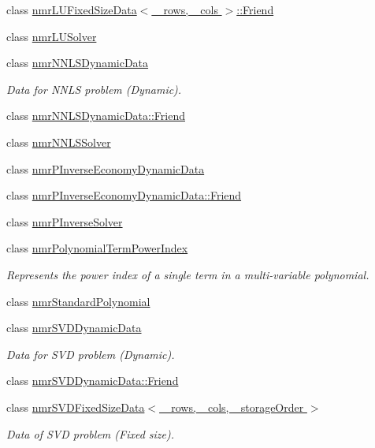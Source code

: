 \begin{DoxyCompactItemize}
class \hyperlink{classnmr_l_u_fixed_size_data_1_1_friend}{nmr\+L\+U\+Fixed\+Size\+Data$<$ \+\_\+rows, \+\_\+cols $>$\+::\+Friend}
\item 
class \hyperlink{classnmr_l_u_solver}{nmr\+L\+U\+Solver}
\item 
class \hyperlink{classnmr_n_n_l_s_dynamic_data}{nmr\+N\+N\+L\+S\+Dynamic\+Data}
\begin{DoxyCompactList}\small\item\em Data for N\+N\+L\+S problem (Dynamic). \end{DoxyCompactList}\item 
class \hyperlink{classnmr_n_n_l_s_dynamic_data_1_1_friend}{nmr\+N\+N\+L\+S\+Dynamic\+Data\+::\+Friend}
\item 
class \hyperlink{classnmr_n_n_l_s_solver}{nmr\+N\+N\+L\+S\+Solver}
\item 
class \hyperlink{classnmr_p_inverse_economy_dynamic_data}{nmr\+P\+Inverse\+Economy\+Dynamic\+Data}
\item 
class \hyperlink{classnmr_p_inverse_economy_dynamic_data_1_1_friend}{nmr\+P\+Inverse\+Economy\+Dynamic\+Data\+::\+Friend}
\item 
class \hyperlink{classnmr_p_inverse_solver}{nmr\+P\+Inverse\+Solver}
\item 
class \hyperlink{classnmr_polynomial_term_power_index}{nmr\+Polynomial\+Term\+Power\+Index}
\begin{DoxyCompactList}\small\item\em Represents the power index of a single term in a multi-\/variable polynomial. \end{DoxyCompactList}\item 
class \hyperlink{classnmr_standard_polynomial}{nmr\+Standard\+Polynomial}
\item 
class \hyperlink{classnmr_s_v_d_dynamic_data}{nmr\+S\+V\+D\+Dynamic\+Data}
\begin{DoxyCompactList}\small\item\em Data for S\+V\+D problem (Dynamic). \end{DoxyCompactList}\item 
class \hyperlink{classnmr_s_v_d_dynamic_data_1_1_friend}{nmr\+S\+V\+D\+Dynamic\+Data\+::\+Friend}
\item 
class \hyperlink{classnmr_s_v_d_fixed_size_data}{nmr\+S\+V\+D\+Fixed\+Size\+Data$<$ \+\_\+rows, \+\_\+cols, \+\_\+storage\+Order $>$}
\begin{DoxyCompactList}\small\item\em Data of S\+V\+D problem (Fixed size). \end{DoxyCompactList}\item 

\end{DoxyCompactItemize}

